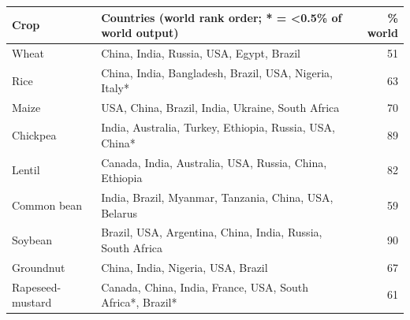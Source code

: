 \begin{tabular}{lp{10.5cm}r}
\toprule
Crop & Countries (world rank order; * = <0.5\% of world output) & \% world \\
\midrule
Wheat & China, India, Russia, USA, Egypt, Brazil & 51 \\
Rice & China, India, Bangladesh, Brazil, USA, Nigeria, Italy* & 63 \\
Maize & USA, China, Brazil, India, Ukraine, South Africa & 70 \\
Chickpea & India, Australia, Turkey, Ethiopia, Russia, USA, China* & 89 \\
Lentil & Canada, India, Australia, USA, Russia, China, Ethiopia & 82 \\
Common bean & India, Brazil, Myanmar, Tanzania, China, USA, Belarus & 59 \\
Soybean & Brazil, USA, Argentina, China, India, Russia, South Africa & 90 \\
Groundnut & China, India, Nigeria, USA, Brazil & 67 \\
Rapeseed-mustard & Canada, China, India, France, USA, South Africa*, Brazil* & 61 \\
\bottomrule
\end{tabular}
